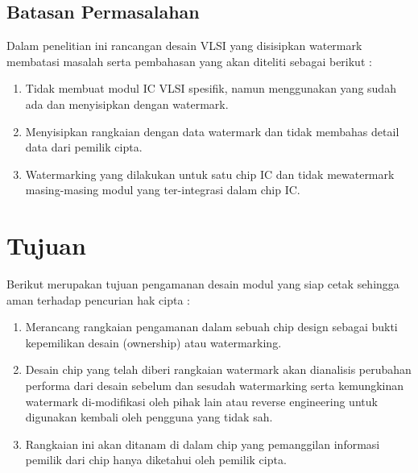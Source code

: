 \subsection{Batasan Permasalahan}
Dalam penelitian ini rancangan desain VLSI yang disisipkan watermark membatasi masalah serta pembahasan yang akan diteliti sebagai berikut :

\begin{enumerate}
	\item Tidak membuat modul IC VLSI spesifik, namun menggunakan yang sudah ada dan menyisipkan dengan watermark.
	
	\item Menyisipkan rangkaian dengan data watermark dan tidak membahas detail data dari pemilik cipta.
	
	\item Watermarking yang dilakukan untuk satu chip IC dan tidak mewatermark masing-masing modul yang ter-integrasi dalam chip IC. 
\end{enumerate}

% 

\section{Tujuan}
Berikut merupakan tujuan pengamanan desain modul yang siap cetak sehingga aman terhadap pencurian hak cipta :
\begin{enumerate}
	\item Merancang rangkaian pengamanan dalam sebuah chip design sebagai bukti kepemilikan desain (ownership) atau watermarking.
	
	\item Desain chip yang telah diberi rangkaian watermark akan dianalisis perubahan performa dari desain sebelum dan sesudah watermarking serta kemungkinan watermark di-modifikasi oleh pihak lain atau reverse engineering untuk digunakan kembali oleh pengguna yang tidak	sah.
	
	\item Rangkaian ini akan ditanam di dalam chip yang pemanggilan informasi pemilik dari chip hanya diketahui oleh pemilik cipta.
\end{enumerate}

% 

